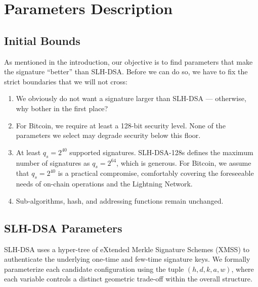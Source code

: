 \section{Parameters Description}

\subsection{Initial Bounds}
As mentioned in the introduction, our objective is to find parameters that make the signature ``better'' than SLH-DSA. Before we can do so, we have to fix the strict boundaries that we will not cross:
\begin{enumerate}
    \item We obviously do not want a signature larger than SLH-DSA — otherwise, why bother in the first place?
    \item For Bitcoin, we require at least a 128-bit security level. None of the parameters we select may degrade security below this floor.
    \item At least $q_{s} = 2^{40}$ supported signatures. SLH-DSA-128s defines the maximum number of signatures as $q_{s} = 2^{64}$, which is generous. For Bitcoin, we assume that $q_{s} = 2^{40}$ is a practical compromise, comfortably covering the foreseeable needs of on-chain operations and the Lightning Network.
    \item Sub-algorithms, hash, and addressing functions remain unchanged.
\end{enumerate}

\subsection{SLH-DSA Parameters}
SLH-DSA uses a hyper-tree of eXtended Merkle Signature Schemes (XMSS) to authenticate the underlying one-time and few-time signature keys. We formally parameterize each candidate configuration using the tuple $(h, d, k, a, w)$, where each variable controls a distinct geometric trade-off within the overall structure.

